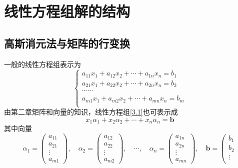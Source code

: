 \section{线性方程组解的结构}
\subsection{高斯消元法与矩阵的行变换}

\begin{definition}
    一般的线性方程组表示为
    \begin{equation}\label{3.1}\tag{3.1}
    \left\{\begin{array}{c}
    a_{11}x_{1}+a_{12}x_{2}+\cdots+a_{1n}x_n=b_1\\
    a_{21}x_{1}+a_{22}x_{2}+\cdots+a_{2n}x_n=b_2\\
    \cdots\cdots\\
    a_{m1}x_{1}+a_{m2}x_{2}+\cdots+a_{mn}x_n=b_m\\
    \end{array}\right.\end{equation}
    由第二章矩阵和向量的知识，线性方程组\eqref{3.1}也可表示成
    \begin{equation}\label{3.2}\tag{3.2}
        x_1\alpha_1+x_2\alpha_2+\cdots+x_n\alpha_n=\boldsymbol{b}
    \end{equation}
    其中向量
    $$\alpha_1=\left(\begin{array}{c}
        a_{11}\\
        a_{21}\\
        \vdots\\
        a_{m1}
    \end{array}\right),\quad
    \alpha_2=\left(\begin{array}{c}
        a_{12}\\
        a_{22}\\
        \vdots\\
        a_{m2}
    \end{array}\right),\quad
    \cdots,\quad
    \alpha_n=\left(\begin{array}{c}
        a_{1n}\\
        a_{2n}\\
        \vdots\\
        a_{mn}
    \end{array}\right),\quad
    \boldsymbol{b}=\left(\begin{array}{c}
        b_{1}\\
        b_{2}\\
        \vdots\\

\end{array}$$
\end{definition}
